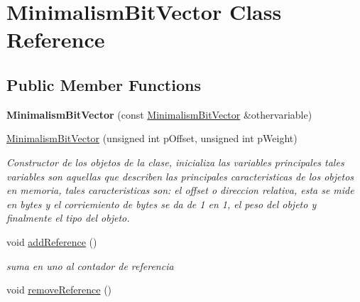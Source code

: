 \hypertarget{class_minimalism_bit_vector}{\section{Minimalism\-Bit\-Vector Class Reference}
\label{class_minimalism_bit_vector}
}
\subsection*{Public Member Functions}
\begin{DoxyCompactItemize}
\item 
\hypertarget{class_minimalism_bit_vector_a86a42058658485f11691aa7d73f89197}{{\bfseries Minimalism\-Bit\-Vector} (const \hyperlink{class_minimalism_bit_vector}{Minimalism\-Bit\-Vector} \&othervariable)}\label{class_minimalism_bit_vector_a86a42058658485f11691aa7d73f89197}

\item 
\hyperlink{class_minimalism_bit_vector_a34fbf98499cea153210a7281fd093d88}{Minimalism\-Bit\-Vector} (unsigned int p\-Offset, unsigned int p\-Weight)
\begin{DoxyCompactList}\small\item\em Constructor de los objetos de la clase, inicializa las variables principales tales variables son aquellas que describen las principales caracteristicas de los objetos en memoria, tales caracteristicas son\-: el offset o direccion relativa, esta se mide en bytes y el corriemiento de bytes se da de 1 en 1, el peso del objeto y finalmente el tipo del objeto. \end{DoxyCompactList}\item 
\hypertarget{class_minimalism_bit_vector_a77e8a538b975ae40aa2205e4bedb6d09}{void \hyperlink{class_minimalism_bit_vector_a77e8a538b975ae40aa2205e4bedb6d09}{add\-Reference} ()}\label{class_minimalism_bit_vector_a77e8a538b975ae40aa2205e4bedb6d09}

\begin{DoxyCompactList}\small\item\em suma en uno al contador de referencia \end{DoxyCompactList}\item 
\hypertarget{class_minimalism_bit_vector_ace33d25bceb2a3c4c2e2820650c37e10}{void \hyperlink{class_minimalism_bit_vector_ace33d25bceb2a3c4c2e2820650c37e10}{remove\-Reference} ()}\label{class_minimalism_bit_vector_ace33d25bceb2a3c4c2e2820650c37e10}


\end{DoxyCompactItemize}
